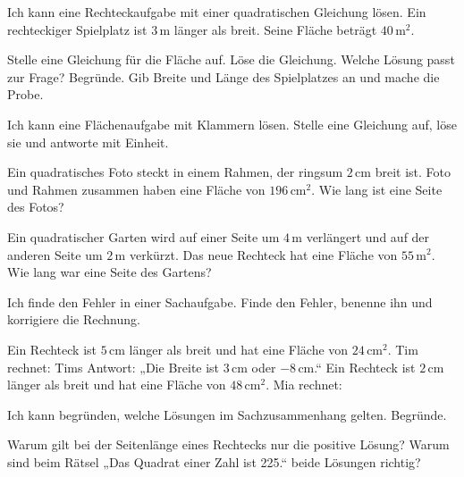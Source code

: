 \begin{aufgabe}{Ich kann eine Rechteckaufgabe mit einer quadratischen Gleichung lösen.}
Ein rechteckiger Spielplatz ist $3\,\text{m}$ länger als breit. Seine Fläche beträgt $40\,\text{m}^2$.


\begin{teile}
\teil Stelle eine Gleichung für die Fläche auf.
\teil Löse die Gleichung.
\teil Welche Lösung passt zur Frage? Begründe.
\teil Gib Breite und Länge des Spielplatzes an und mache die Probe.
\end{teile}
\end{aufgabe}

\begin{aufgabe}{Ich kann eine Flächenaufgabe mit Klammern lösen.}
Stelle eine Gleichung auf, löse sie und antworte mit Einheit.
\begin{teile}
\teil Ein quadratisches Foto steckt in einem Rahmen, der ringsum $2\,\text{cm}$ breit ist. Foto und Rahmen zusammen haben eine Fläche von $196\,\text{cm}^2$. Wie lang ist eine Seite des Fotos?
\end{teile}


\begin{teile}
\teil Ein quadratischer Garten wird auf einer Seite um $4\,\text{m}$ verlängert und auf der anderen Seite um $2\,\text{m}$ verkürzt. Das neue Rechteck hat eine Fläche von $55\,\text{m}^2$. Wie lang war eine Seite des Gartens?
\end{teile}


\end{aufgabe}

\begin{aufgabe}{Ich finde den Fehler in einer Sachaufgabe.}
Finde den Fehler, benenne ihn und korrigiere die Rechnung.
\begin{teile}
\teil Ein Rechteck ist $5\,\text{cm}$ länger als breit und hat eine Fläche von $24\,\text{cm}^2$. Tim rechnet:  Tims Antwort: „Die Breite ist $3\,\text{cm}$ oder $-8\,\text{cm}$.“
\teil Ein Rechteck ist $2\,\text{cm}$ länger als breit und hat eine Fläche von $48\,\text{cm}^2$. Mia rechnet: 
\end{teile}
\end{aufgabe}

\begin{aufgabe}{Ich kann begründen, welche Lösungen im Sachzusammenhang gelten.}
Begründe.
\begin{teile}
\teil Warum gilt bei der Seitenlänge eines Rechtecks nur die positive Lösung?
\teil Warum sind beim Rätsel „Das Quadrat einer Zahl ist 225.“ beide Lösungen richtig?
\end{teile}
\end{aufgabe}

